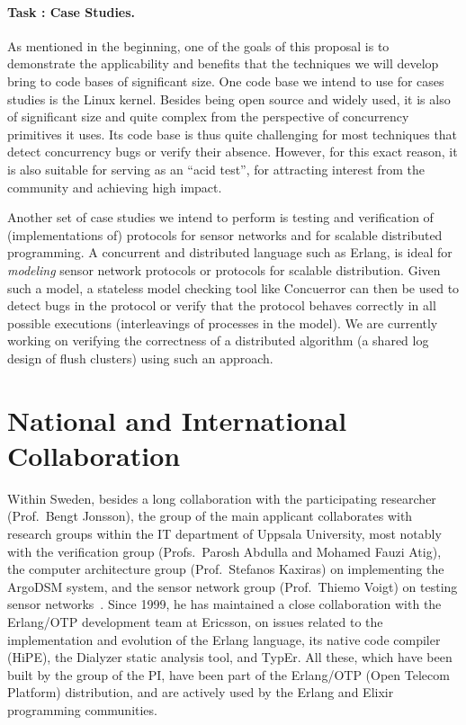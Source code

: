 \documentclass[11pt]{article}
\newcommand{\system}[1]{\mbox{\textsf{#1}}}
\newcounter{Task}
\newcommand{\task}[1]{\addtocounter{Task}{1}\paragraph{Task \theTask: #1}}
\newcommand{\myparagraph}{}
\let\myparagraph=\paragraph
\renewcommand{\paragraph}{\vspace{-3mm}\myparagraph}
\begin{document}
{\task{Case Studies.}
As mentioned in the beginning, one of the goals of this proposal is to
demonstrate the applicability and benefits that the techniques we will
develop bring to code bases of significant size.  One code base we intend
to use for cases studies is the Linux kernel.  Besides being open source
and widely used, it is also of significant size and quite complex from the
perspective of concurrency primitives it uses.  Its code base is thus quite
challenging for most techniques that detect concurrency bugs or verify
their absence.  However, for this exact reason, it is also suitable for
serving as an ``acid test'', for attracting interest from the community and
achieving high impact.

Another set of case studies we intend to perform is testing and
verification of (implementations of) protocols for sensor networks and for
scalable distributed programming.  A concurrent and distributed language
such as Erlang, is ideal for \emph{modeling} sensor network protocols or
protocols for scalable distribution.  Given such a model, a stateless model
checking tool like \system{Concuerror} can then be used to detect bugs in
the protocol or verify that the protocol behaves correctly in all possible
executions (interleavings of processes in the model).  We are currently
working on verifying the correctness of a distributed algorithm (a shared
log design of flush clusters) using such an approach.
}


\section{National and International Collaboration} \label{sec:collaboration}
Within Sweden, besides a long collaboration with the participating researcher
(Prof.~Bengt Jonsson), the group of the main applicant collaborates with
research groups within the IT department of Uppsala University, most notably
with the verification group (Profs.~Parosh Abdulla and Mohamed Fauzi Atig),
the computer architecture group (Prof.~Stefanos Kaxiras) on implementing the
ArgoDSM system, and the sensor network group (Prof.~Thiemo Voigt) on testing
sensor networks~\cite{PBT@SECON-15}.
%
Since 1999, he has maintained a close collaboration with the
\system{Erlang/OTP} development team at Ericsson, on issues related to the
implementation and evolution of the Erlang language, its native code compiler
(\system{HiPE}), the \system{Dialyzer} static analysis tool, and
\system{TypEr}. All these, which have been built by the group of the PI, have
been part of the Erlang/OTP (Open Telecom Platform) distribution, and are
actively used by the Erlang and Elixir programming communities.
\end{document}
